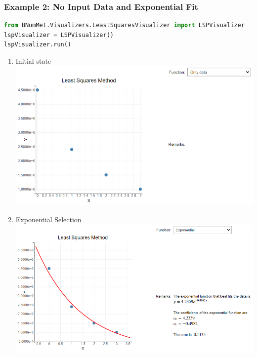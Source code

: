 \subsubsection{Example 2: No Input Data and Exponential Fit}
\begin{lstlisting}[language=Python]
from BNumMet.Visualizers.LeastSquaresVisualizer import LSPVisualizer
lspVisualizer = LSPVisualizer()
lspVisualizer.run()
\end{lstlisting}
\begin{enumerate}
    \item Initial state\\
    \includegraphics[scale=0.6]{Include/Images/Thesis/Documentation/Visualizers/LeastSquares/Example 2/Example 2 - 00 - Initial State.png}
    \item Exponential Selection\\
    \includegraphics[scale=0.6]{Include/Images/Thesis/Documentation/Visualizers/LeastSquares/Example 2/Example 2 - 00 - Exponential.png}
\end{enumerate}

